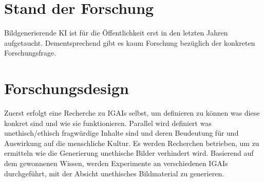 \documentclass[12pt]{article}
\begin{document}
\section{Stand der Forschung}
Bildgenerierende KI ist für die Öffentlichkeit erst in den letzten Jahren aufgetaucht. Dementsprechend gibt es kaum Forschung bezüglich der konkreten Forschungsfrage.
\section{Forschungsdesign}
Zuerst erfolgt eine Recherche zu IGAIs selbst, um definieren zu können was diese konkret sind und wie sie funktionieren. Parallel wird definiert was unethisch/ethisch fragwürdige Inhalte sind und deren Beudeutung für und Auswirkung auf die menschliche Kultur. Es werden Recherchen betrieben, um zu ermitteln wie die Generierung unethische Bilder verhindert wird. Basierend auf dem gewonnenen Wissen, werden Experimente an verschiedenen IGAIs durchgeführt, mit der Absicht unethisches Bildmaterial zu generieren.
\end{document}
